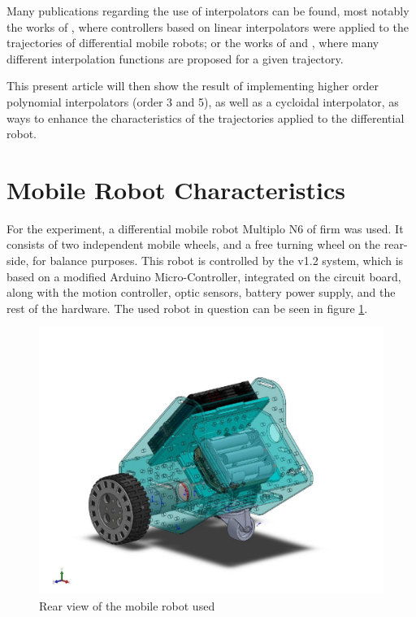 \documentclass[a4paper]{aadeca}
\begin{document}
Many publications regarding the use of interpolators can be found, most notably the works of \cite{scaglia_linear-interpolation-based_2010}, where controllers based on linear interpolators were applied to the trajectories of differential mobile robots; or the works of \cite{canini_controllo_2003} and \cite{n3spline}, where many different interpolation functions are proposed for a given trajectory.

This present article will then show the result of implementing higher order polynomial interpolators (order 3 and 5), as well as a cycloidal interpolator, as ways to enhance  the characteristics of the trajectories applied to the differential robot.

\section{Mobile Robot Characteristics}

For the experiment, a differential mobile robot Multiplo N6 of \cite{robotgroupe_robots_2016} firm was used.
It consists of two independent mobile wheels, and a free turning wheel on the rear-side, for balance purposes.
This robot is controlled by the \cite{duinobot_multiplo_2016} v1.2 system, which is based on a modified Arduino Micro-Controller, integrated on the circuit board, along with the motion controller, optic sensors, battery power supply, and the rest of the hardware.
The used robot in question can be seen in figure \ref{fig:robo}.

\begin{figure}[h]
\centering
\includegraphics[width=0.7\linewidth]{./robo}
\caption{Rear view of the mobile robot used}
\label{fig:robo}
\end{figure}
\end{document}
